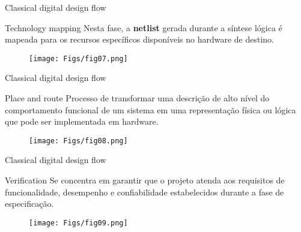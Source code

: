 \documentclass[aspectratio=169]{beamer}
\begin{document}
\begin{frame}{Classical digital design flow}
	
	\begin{block}{Technology mapping}
		\justifying
		Nesta fase, a \textbf{netlist} gerada durante a síntese lógica é mapeada para os recursos específicos disponíveis no hardware de destino.
	\end{block}		
	
	\begin{figure}[h]
		\centering
		\texttt{[image: Figs/fig07.png]}
	\end{figure}
	
\end{frame}

\begin{frame}{Classical digital design flow}
	
	
	\begin{block}{Place and route}
		\justifying
		Processo de transformar uma descrição de alto nível do comportamento funcional de um sistema em uma representação física ou lógica que pode ser implementada em hardware.
	\end{block}	
	
	\begin{figure}[h]
		\centering
		\texttt{[image: Figs/fig08.png]}
	\end{figure}

	
\end{frame}
\begin{frame}{Classical digital design flow}

	\begin{block}{Verification}
		\justifying
		Se concentra em garantir que o projeto atenda aos requisitos de funcionalidade, desempenho e confiabilidade estabelecidos durante a fase de especificação.
	\end{block}		
	
	\begin{figure}[h]
		\centering
		\texttt{[image: Figs/fig09.png]}
	\end{figure}
	
\end{frame}
\end{document}
